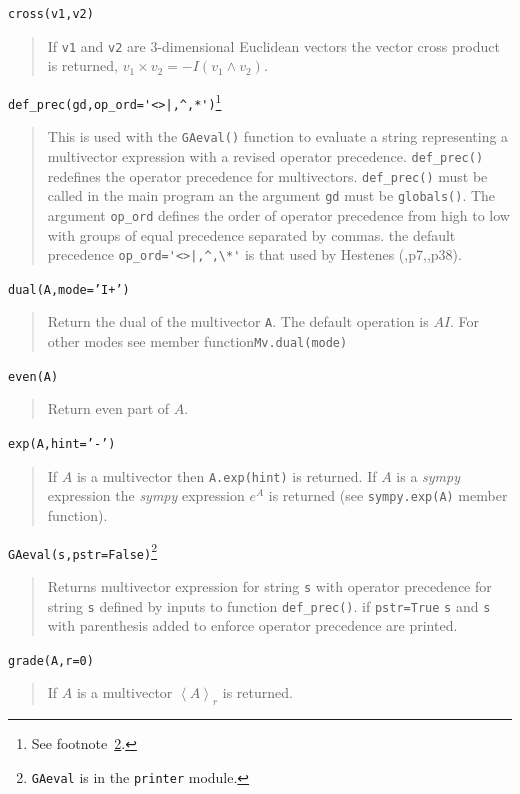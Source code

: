 \documentclass[12pt]{report}
\newcommand{\lp}{\left (}
\newcommand{\rp}{\right )}
\newcommand{\W}{\wedge}
\newcommand{\grade}[1]{\left < {#1} \right >}
\newcommand{\paren}[1]{\lp {#1} \rp}
\newcommand{\T}[1]{\texttt{#1}}
\begin{document}
\T{cross(v1,v2)}
\begin{quote}
   If \T{v1} and \T{v2} are 3-dimensional Euclidean vectors the vector cross product is
   returned, $v_{1}\times v_{2} = -I\paren{v_{1}\W v_{2}}$.
\end{quote}

\lstinline$def_prec(gd,op_ord='<>|,^,*')$\footnote{See footnote~\ref{fn_6}.}
\begin{quote}
   This is used with the \T{GAeval()} function to evaluate a string representing a multivector
   expression with a revised operator precedence.  \T{def\_prec()} redefines the operator
   precedence for multivectors. \T{def\_prec()} must be called in the main program an the
   argument \T{gd} must be \T{globals()}.  The argument \T{op\_ord} defines the order of operator
   precedence from high to low with groups of equal precedence separated by commas. the default
   precedence \lstinline$op_ord='<>|,^,\*'$ is that used by Hestenes (\cite{Hestenes},p7,\cite{Doran},p38).
\end{quote}

\T{dual(A,mode='I+')}
\begin{quote}
   Return the dual of the multivector \T{A}. The default operation is $AI$.  For other modes see member
   function\T{Mv.dual(mode)}
\end{quote}

\T{even(A)}
\begin{quote}
    Return even part of $A$.
\end{quote}

\T{exp(A,hint='-')}
\begin{quote}
    If $A$ is a multivector then \T{A.exp(hint)} is returned.  If $A$ is a \emph{sympy}
    expression the \emph{sympy}     expression $e^{A}$ is returned (see \T{sympy.exp(A)} member function).
\end{quote}

\T{GAeval(s,pstr=False)}\footnote{\T{GAeval} is in the \T{printer} module.\label{fn_6}}
\begin{quote}
   Returns multivector expression for string \T{s} with operator precedence for
   string \T{s} defined by inputs to function \T{def\_prec()}.  if \T{pstr=True}
   \T{s} and \T{s} with parenthesis added to enforce operator precedence are printed.
\end{quote}

\T{grade(A,r=0)}
\begin{quote}
    If $A$ is a multivector $\grade{A}_{r}$ is returned.
\end{quote}
\end{document}
